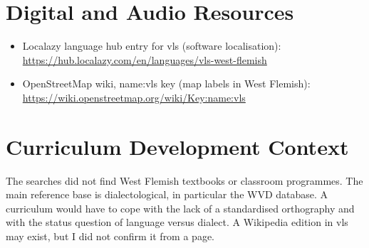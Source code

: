 \documentclass[12pt]{article}
\begin{document}
\section{Digital and Audio Resources}
\begin{itemize}
\item Localazy language hub entry for vls (software localisation): \url{https://hub.localazy.com/en/languages/vls-west-flemish}
\item OpenStreetMap wiki, name:vls key (map labels in West Flemish): \url{https://wiki.openstreetmap.org/wiki/Key:name:vls}
\end{itemize}

\section{Curriculum Development Context}
The searches did not find West Flemish textbooks or classroom programmes. The main reference base is dialectological, in particular the WVD database. A curriculum would have to cope with the lack of a standardised orthography and with the status question of language versus dialect. A Wikipedia edition in vls may exist, but I did not confirm it from a page.
\end{document}
